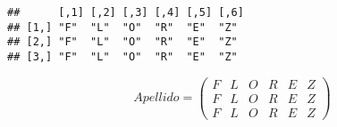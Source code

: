 \documentclass[
]{article}
\begin{document}
\begin{verbatim}
##      [,1] [,2] [,3] [,4] [,5] [,6]
## [1,] "F"  "L"  "O"  "R"  "E"  "Z" 
## [2,] "F"  "L"  "O"  "R"  "E"  "Z" 
## [3,] "F"  "L"  "O"  "R"  "E"  "Z"
\end{verbatim}

\[ Apellido = \begin{equation*}\begin{pmatrix} F & L & O & R & E & Z\\ F & L & O & R & E & Z\\ F & L & O & R & E & Z 
\end{pmatrix}\end{equation*}\]
\end{document}
